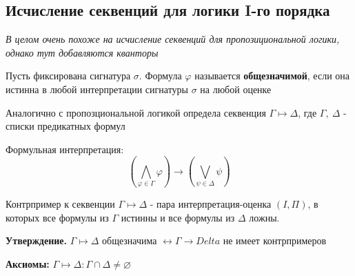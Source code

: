 \subsection{Исчисление секвенций для логики I-го порядка}
\textit{В целом очень похоже на исчисление секвенций для пропозициональной логики,
однако тут добавляются кванторы}

\begin{conj}
    Пусть фиксирована сигнатура $\sigma$. Формула $\varphi$ называется \textbf{общезначимой}, если 
    она истинна в любой интерпретации сигнатуры $\sigma$ на любой оценке 
\end{conj}

Аналогично с пропозциональной логикой определа секвенция $\Gamma \mapsto \Delta$, где $\Gamma,\ \Delta$ - списки предикатных формул

Формульная интерпретация:
\[ \left(\bigwedge_{\varphi \in \Gamma} \varphi \right) \to \left(\bigvee_{\psi \in \Delta} \psi \right)  \]

\begin{conj}
    Контрпример к секвенции $\Gamma \mapsto \Delta$ - пара интерпретация-оценка $(I, \Pi)$, в которых 
    все формулы из $\Gamma$ истинны и все формулы из $\Delta$ ложны.
\end{conj}

\textbf{Утверждение.} $\Gamma \mapsto \Delta$ общезначима $\leftrightarrow \Gamma \to Delta$ не имеет контрпримеров

\textbf{Аксиомы:} $\Gamma \mapsto \Delta : \Gamma \cap \Delta \neq \varnothing$

